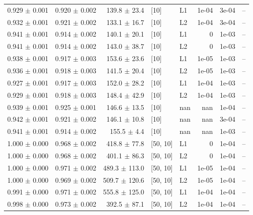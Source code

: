 \documentclass[reprint,english,notitlepage, floatfix]{revtex4-2}  %
\begin{document}
\begin{longtable}{r r r l l r r l}
\rowcolor{Cluster1} 0.929 $\pm$ 0.001 & 0.920 $\pm$ 0.002 & 139.8 $\pm$ 23.4 & [10] & L1 & 1e-04 & 3e-04 & -- \\
\rowcolor{Cluster1} 0.932 $\pm$ 0.001 & 0.921 $\pm$ 0.002 & 133.1 $\pm$ 16.7 & [10] & L2 & 1e-04 & 3e-04 & -- \\
\rowcolor{Cluster1} 0.941 $\pm$ 0.001 & 0.914 $\pm$ 0.002 & 140.1 $\pm$ 20.1 & [10] & L1 & 0 & 1e-03 & -- \\
\rowcolor{Cluster1} 0.941 $\pm$ 0.001 & 0.914 $\pm$ 0.002 & 143.0 $\pm$ 38.7 & [10] & L2 & 0 & 1e-03 & -- \\
\rowcolor{Cluster1} 0.938 $\pm$ 0.001 & 0.917 $\pm$ 0.003 & 153.6 $\pm$ 23.6 & [10] & L1 & 1e-05 & 1e-03 & -- \\
\rowcolor{Cluster1} 0.936 $\pm$ 0.001 & 0.918 $\pm$ 0.003 & 141.5 $\pm$ 20.4 & [10] & L2 & 1e-05 & 1e-03 & -- \\
\rowcolor{Cluster1} 0.927 $\pm$ 0.001 & 0.917 $\pm$ 0.003 & 152.0 $\pm$ 28.2 & [10] & L1 & 1e-04 & 1e-03 & -- \\
\rowcolor{Cluster1} 0.929 $\pm$ 0.001 & 0.918 $\pm$ 0.003 & 148.4 $\pm$ 42.9 & [10] & L2 & 1e-04 & 1e-03 & -- \\
\rowcolor{Cluster1} 0.939 $\pm$ 0.001 & 0.925 $\pm$ 0.001 & 146.6 $\pm$ 13.5 & [10] & nan & nan & 1e-04 & -- \\
\rowcolor{Cluster1} 0.942 $\pm$ 0.001 & 0.921 $\pm$ 0.002 & 146.1 $\pm$ 10.8 & [10] & nan & nan & 3e-04 & -- \\
\rowcolor{Cluster1} 0.941 $\pm$ 0.001 & 0.914 $\pm$ 0.002 & 155.5 $\pm$ 4.4 & [10] & nan & nan & 1e-03 & -- \\
\rowcolor{Cluster2} 1.000 $\pm$ 0.000 & 0.968 $\pm$ 0.002 & 418.8 $\pm$ 77.8 & [50, 10] & L1 & 0 & 1e-04 & -- \\
\rowcolor{Cluster2} 1.000 $\pm$ 0.000 & 0.968 $\pm$ 0.002 & 401.1 $\pm$ 86.3 & [50, 10] & L2 & 0 & 1e-04 & -- \\
\rowcolor{Cluster2} 1.000 $\pm$ 0.000 & 0.971 $\pm$ 0.002 & 489.3 $\pm$ 113.0 & [50, 10] & L1 & 1e-05 & 1e-04 & -- \\
\rowcolor{Cluster2} 1.000 $\pm$ 0.000 & 0.969 $\pm$ 0.002 & 509.7 $\pm$ 120.6 & [50, 10] & L2 & 1e-05 & 1e-04 & -- \\
\rowcolor{Cluster2} 0.991 $\pm$ 0.000 & 0.971 $\pm$ 0.002 & 555.8 $\pm$ 125.0 & [50, 10] & L1 & 1e-04 & 1e-04 & -- \\
\rowcolor{Cluster2} 0.998 $\pm$ 0.000 & 0.973 $\pm$ 0.002 & 392.5 $\pm$ 87.1 & [50, 10] & L2 & 1e-04 & 1e-04 & -- \\

\end{longtable}
\end{document}
